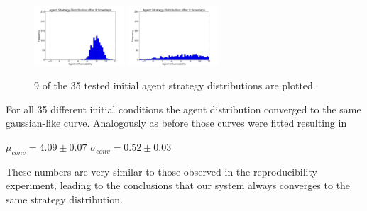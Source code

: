 \documentclass[11pt]{article}
\begin{document}
\begin{figure}
  \includegraphics[width=0.3\textwidth]{figures/ic8.png}
  \includegraphics[width=0.3\textwidth]{figures/ic9.png}
  \caption[Different Initial Conditions]{9 of the 35 tested initial agent strategy distributions are plotted.}
  \label{fig:initialconditions}
\end{figure}
For all 35 different initial conditions the agent distribution converged to the same gaussian-like curve. Analogously as before those curves were fitted resulting in
\begin{center}
  $\mu_{conv} = 4.09\pm 0.07$
  $\sigma_{conv} = 0.52\pm 0.03$
\end{center}
These numbers are very similar to those observed in the reproducibility experiment, leading to the conclusions that our system always converges to the same strategy distribution.
\end{document}
